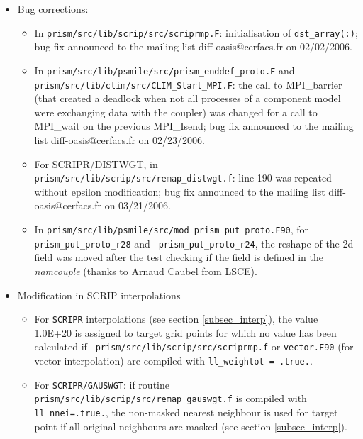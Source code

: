 \begin{itemize}

\item Bug corrections:

  \begin{itemize}

  \item In {\tt prism/src/lib/scrip/src/scriprmp.F}: initialisation of
    {\tt dst\_array(:)}; bug fix announced to the mailing list
    diff-oasis@cerfacs.fr on 02/02/2006.

  \item In {\tt prism/src/lib/psmile/src/prism\_enddef\_proto.F} and {\tt
      prism/src/lib/\break clim/src/CLIM\_Start\_MPI.F}: the call to
    MPI\_barrier (that created a deadlock when not all processes of a
    component model were exchanging data with the coupler) was changed
    for a call to MPI\_wait on the previous MPI\_Isend; bug fix
    announced to the mailing list diff-oasis@cerfacs.fr on
    02/23/2006.

  \item For SCRIPR/DISTWGT, in {\tt
      prism/src/lib/scrip/src/remap\_distwgt.f}: line 190 was repeated
    without epsilon modification; bug fix announced to the mailing
    list diff-oasis@cerfacs.fr on 03/21/2006.

  \item In {\tt prism/src/lib/psmile/src/mod\_prism\_put\_proto.F90},
    for {\tt prism\_put\break \_proto\_r28} and {\tt
      prism\_put\_proto\_r24}, the reshape of the 2d field was moved
    after the test checking if the field is defined in the {\it namcouple}
    (thanks to Arnaud Caubel from LSCE).

  \end{itemize}

\item Modification in SCRIP interpolations

  \begin{itemize}

  \item For {\tt SCRIPR} interpolations (see section
    \ref{subsec_interp}), the value 1.0E+20 is assigned to target grid
    points for which no value has been calculated if {\tt
      prism/src/lib/scrip/src/scriprmp.f} or {\tt vector.F90} (for
    vector interpolation) are compiled with {\tt ll\_weightot =
      .true.}.

  \item For {\tt SCRIPR/GAUSWGT}: if routine {\tt
      prism/src/lib/scrip/src/remap\_gauswgt.f} is compiled with {\tt
      ll\_nnei=.true.}, the non-masked nearest neighbour is used for
    target point if all original neighbours are masked (see section
    \ref{subsec_interp}).


\end{itemize}
\end{itemize}
